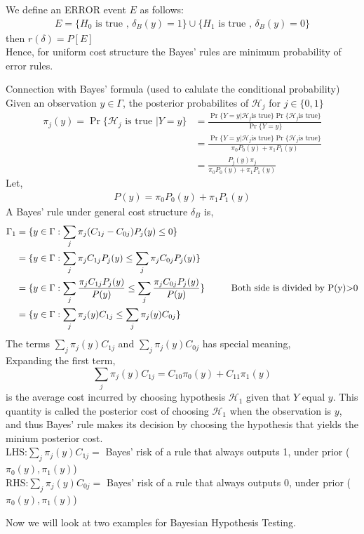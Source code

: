 \documentclass[12pt]{report}
\begin{document}
\begin{itemize}
\noindent
We define an ERROR event $E$ as follows:
\begin{align*}
E = \{H_0 \text{ is true , }  \delta_B(y) = 1\}  \cup \{H_1  \text{ is true , } \delta_B(y) = 0\}
\end{align*}
then $r(\delta) = P[E]$\\
Hence, for uniform cost structure the Bayes' rules are minimum probability of error rules.
\begin{note}
Connection with Bayes' formula (used to calulate the conditional probability)\\
Given an observation $y\in\Gamma$, the posterior probabilites of $\mathcal{H}_j$ for $j\in\{0,1\}$
\begin{align} 
\pi_j(y) = \Pr\{ \mathcal{H}_j \text{ is true } | Y = y \} &= \frac{\Pr\{ Y=y | \mathcal{H}_j \text{is true} \}\Pr\{ \mathcal{H}_j \text{is true}\}}{\Pr\{Y=y\}}\\
&=\frac{\Pr\{ Y=y | \mathcal{H}_j \text{is true} \}\Pr\{ \mathcal{H}_j \text{is true}\}}{\pi_0P_0(y) + \pi_1P_1(y)}\\
&=\frac{P_j(y)\pi_j}{\pi_0P_0(y) + \pi_1P_1(y)}
\end{align}
Let, 
\begin{align*} 
P(y) =\pi_0P_0(y) + \pi_1P_1(y)
\end{align*}
A Bayes' rule under general cost structure $\delta_B$ is,
\begin{align*} 
\Gamma_1 &= \{ y\in\Gamma : \sum_{j}\pi_j(C_{1j}-C_{0j})P_j(y) \leq 0\}\\
&=\{ y\in\Gamma : \sum_{j}\pi_j C_{1j} P_j(y) \leq \sum_{j}\pi_j C_{0j} P_j(y) \}\\
&=\{ y\in\Gamma : \sum_{j}\frac{\pi_j C_{1j} P_j(y)}{P(y)}  \leq  \sum_{j}\frac{\pi_j C_{0j} P_j(y)}{P(y)}\}\hspace{10 mm}\text{Both side is divided by P(y)$>$0}\\
&=\{ y\in\Gamma : \sum_{j}\pi_j(y) C_{1j}  \leq \sum_{j}\pi_j(y) C_{0j}\}
\end{align*}
The terms $\sum_{j}\pi_j(y) C_{1j}$ and $\sum_{j}\pi_j(y) C_{0j}$ has special meaning,\\
Expanding the first term,\\
\begin{equation}
\nonumber
\sum_{j}\pi_j(y) C_{1j} = C_{10} \pi_0(y) + C_{11} \pi_1(y)
\end{equation}
is the average cost incurred by choosing hypothesis $\mathcal{H}_1$ given that $Y$ equal $y$. This quantity is called the posterior cost of choosing $\mathcal{H}_1$ when the observation is $y$, and thus Bayes' rule makes its decision by choosing the hypothesis that yields the minium posterior cost.\\
LHS:\hspace{10 mm}$\sum_{j}\pi_j(y) C_{1j} = $ Bayes' risk of a rule that always outputs 1, under prior ($\pi_0(y),\pi_1(y)$)\\
RHS:\hspace{10 mm}$\sum_{j}\pi_j(y) C_{0j} = $ Bayes' risk of a rule that always outputs 0, under prior ($\pi_0(y),\pi_1(y)$)
\end{note}
Now we will look at two examples for Bayesian Hypothesis Testing.


\end{itemize}
\end{document}
